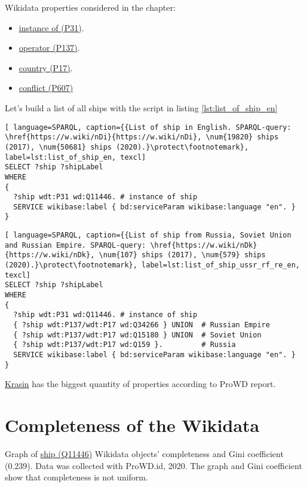 Wikidata properties considered in the chapter: 
\begin{itemize}
  \item \href{https://www.wikidata.org/wiki/Property:P31}{instance of (P31)}.
  \item \href{https://www.wikidata.org/wiki/Property:P137}{operator (P137)}.
  \item \href{https://www.wikidata.org/wiki/Property:P17}{country (P17)}.
  \item \href{https://www.wikidata.org/wiki/Property:P607}{conflict (P607)}
\end{itemize}

Let's build a list of all ships with the script in listing \ref{lst:list_of_ship_en}

\begin{lstlisting}[ language=SPARQL, caption={{List of ship in English. SPARQL-query: \href{https://w.wiki/nDi}{https://w.wiki/nDi}, \num{19820} ships (2017), \num{50681} ships (2020).}\protect\footnotemark}, label=lst:list_of_ship_en, texcl]
SELECT ?ship ?shipLabel
WHERE
{
  ?ship wdt:P31 wd:Q11446. # instance of ship
  SERVICE wikibase:label { bd:serviceParam wikibase:language "en". }
}
\end{lstlisting}

  
\begin{lstlisting}[ language=SPARQL, caption={{List of ship from Russia, Soviet Union and Russian Empire. SPARQL-query: \href{https://w.wiki/nDk}{https://w.wiki/nDk}, \num{107} ships (2017), \num{579} ships (2020).}\protect\footnotemark}, label=lst:list_of_ship_ussr_rf_re_en, texcl]
SELECT ?ship ?shipLabel
WHERE
{
  ?ship wdt:P31 wd:Q11446. # instance of ship
  { ?ship wdt:P137/wdt:P17 wd:Q34266 } UNION  # Russian Empire
  { ?ship wdt:P137/wdt:P17 wd:Q15180 } UNION  # Soviet Union
  { ?ship wdt:P137/wdt:P17 wd:Q159 }.         # Russia
  SERVICE wikibase:label { bd:serviceParam wikibase:language "en". }
}
\end{lstlisting}

\href{https://www.wikidata.org/wiki/Q281147}{Krasin} has the biggest quantity of properties according to ProWD report\cite{}.
  


\section{Completeness of the Wikidata}

\begin{marginfigure}[0.0cm]
  {
    \setlength{\fboxsep}{0pt}%
    \setlength{\fboxrule}{1pt}%
  }
  \caption{
    Graph of \href{https://www.wikidata.org/wiki/Q11446}{ship (Q11446)} Wikidata objects' completeness and Gini coefficient (0.239). Data was collected with ProWD.id, 2020. The graph and Gini coefficient show that completeness is not uniform.
    }%
    \label{fig:prowd_ships-unbalanced}%
\end{marginfigure}


